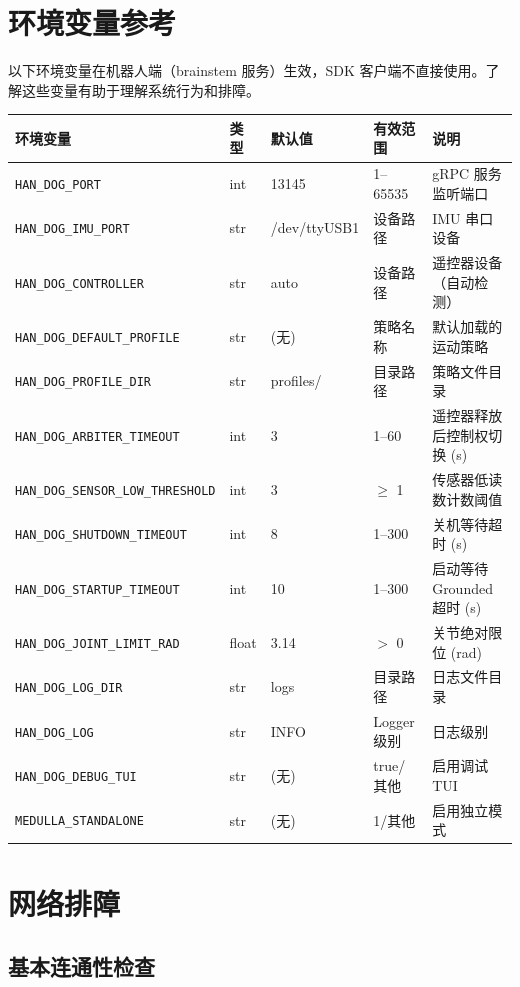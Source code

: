 \documentclass[a4paper,11pt,openany]{book}
\begin{document}
\section{环境变量参考}

以下环境变量在机器人端（brainstem 服务）生效，SDK 客户端不直接使用。了解这些变量有助于理解系统行为和排障。

{\small
\begin{longtable}{lllll}
\toprule
环境变量 & 类型 & 默认值 & 有效范围 & 说明 \\
\midrule
\endhead
\texttt{HAN\_DOG\_PORT} & int & 13145 & 1--65535 & gRPC 服务监听端口 \\
\texttt{HAN\_DOG\_IMU\_PORT} & str & /dev/ttyUSB1 & 设备路径 & IMU 串口设备 \\
\texttt{HAN\_DOG\_CONTROLLER} & str & auto & 设备路径 & 遥控器设备（自动检测） \\
\texttt{HAN\_DOG\_DEFAULT\_PROFILE} & str & (无) & 策略名称 & 默认加载的运动策略 \\
\texttt{HAN\_DOG\_PROFILE\_DIR} & str & profiles/ & 目录路径 & 策略文件目录 \\
\texttt{HAN\_DOG\_ARBITER\_TIMEOUT} & int & 3 & 1--60 & 遥控器释放后控制权切换 (s) \\
\texttt{HAN\_DOG\_SENSOR\_LOW\_THRESHOLD} & int & 3 & $\geq$ 1 & 传感器低读数计数阈值 \\
\texttt{HAN\_DOG\_SHUTDOWN\_TIMEOUT} & int & 8 & 1--300 & 关机等待超时 (s) \\
\texttt{HAN\_DOG\_STARTUP\_TIMEOUT} & int & 10 & 1--300 & 启动等待 Grounded 超时 (s) \\
\texttt{HAN\_DOG\_JOINT\_LIMIT\_RAD} & float & 3.14 & $>$ 0 & 关节绝对限位 (rad) \\
\texttt{HAN\_DOG\_LOG\_DIR} & str & logs & 目录路径 & 日志文件目录 \\
\texttt{HAN\_DOG\_LOG} & str & INFO & Logger 级别 & 日志级别 \\
\texttt{HAN\_DOG\_DEBUG\_TUI} & str & (无) & true/其他 & 启用调试 TUI \\
\texttt{MEDULLA\_STANDALONE} & str & (无) & 1/其他 & 启用独立模式 \\
\bottomrule
\end{longtable}
}

\section{网络排障}

\subsection{基本连通性检查}
\end{document}
